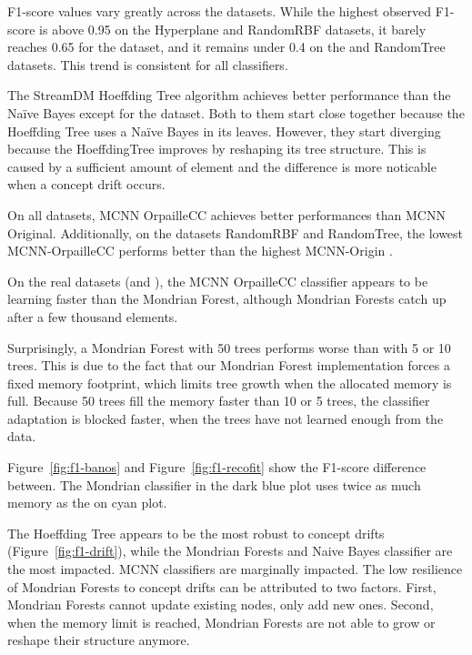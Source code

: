 
F1-score values vary greatly across the datasets.  While the highest
observed F1-score is above 0.95 on the Hyperplane and RandomRBF datasets,
it barely reaches 0.65 for the \banosdataset dataset, and it remains under
0.4 on the \recofitdataset and RandomTree datasets. This trend is
consistent for all classifiers.

The StreamDM Hoeffding Tree algorithm achieves better performance than the
Naïve Bayes except for the \banosdataset dataset.  Both to them start close
together because the Hoeffding Tree uses a Naïve Bayes in its leaves.  However,
they start diverging because the HoeffdingTree improves by reshaping its tree
structure.  This is caused by a sufficient amount of element and the difference
is more noticable when a concept drift occurs.

On all datasets, MCNN OrpailleCC achieves better performances than MCNN
Original. Additionally, on the datasets RandomRBF and RandomTree, the lowest
MCNN-OrpailleCC performs better than the highest MCNN-Origin .

On the real datasets (\banosdataset and \recofitdataset), the MCNN OrpailleCC
classifier appears to be learning faster than the Mondrian Forest, although
Mondrian Forests catch up after a few thousand elements. 

Surprisingly, a Mondrian Forest with 50 trees performs worse than with 5 or 10
trees. This is due to the fact that our Mondrian Forest implementation forces a
fixed memory footprint, which limits tree growth when the allocated memory is
full. Because 50 trees fill the memory faster than 10 or 5 trees, the
classifier adaptation is blocked faster, when the trees have not learned enough
from the data.

Figure~\ref{fig:f1-banos} and Figure~\ref{fig:f1-recofit} show the F1-score
difference between. The Mondrian classifier in the dark blue plot uses twice as
much memory as the on cyan plot. 

The Hoeffding Tree appears to be the most robust to concept drifts
(Figure~\ref{fig:f1-drift}), while the Mondrian Forests and Naive Bayes
classifier are the most impacted. MCNN classifiers are marginally impacted.
The low resilience of Mondrian Forests to concept drifts can be attributed to
two factors. First, Mondrian Forests cannot update existing nodes, only add new ones.
Second, when the memory limit is reached, Mondrian Forests are not able to grow
or reshape their structure anymore.

